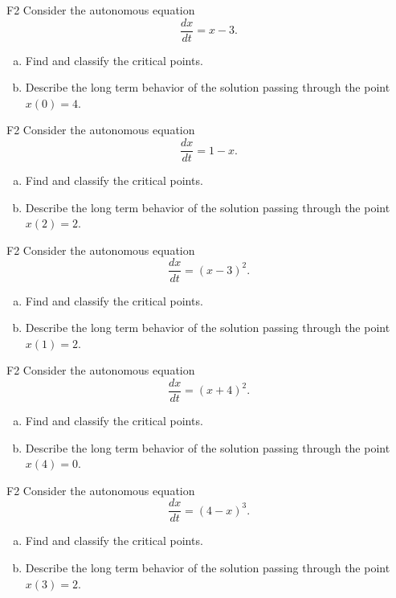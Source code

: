 \begin{problem}{F2}
Consider the autonomous equation
\[
\frac{dx}{dt} = x - 3.
\]
\begin{enumerate}[(a)]
\item Find and classify the critical points.
\item Describe the long term behavior of the solution passing through the point \(x(0)=4\).
\end{enumerate}
\end{problem}

\begin{problem}{F2}
Consider the autonomous equation
\[
\frac{dx}{dt} = 1 - x.
\]
\begin{enumerate}[(a)]
\item Find and classify the critical points.
\item Describe the long term behavior of the solution passing through the point \(x(2)=2\).
\end{enumerate}
\end{problem}

\begin{problem}{F2}
Consider the autonomous equation
\[
\frac{dx}{dt} = (x - 3)^2.
\]\begin{enumerate}[(a)]
\item Find and classify the critical points.
\item Describe the long term behavior of the solution passing through the point \(x(1)=2\).
\end{enumerate}
\end{problem}

\begin{problem}{F2}
Consider the autonomous equation
\[
\frac{dx}{dt} = (x + 4)^2.
\]\begin{enumerate}[(a)]
\item Find and classify the critical points.
\item Describe the long term behavior of the solution passing through the point \(x(4)=0\).
\end{enumerate}
\end{problem}

\begin{problem}{F2}
Consider the autonomous equation
\[
\frac{dx}{dt} = (4 - x)^3.
\]\begin{enumerate}[(a)]
\item Find and classify the critical points.
\item Describe the long term behavior of the solution passing through the point \(x(3)=2\).
\end{enumerate}
\end{problem}

